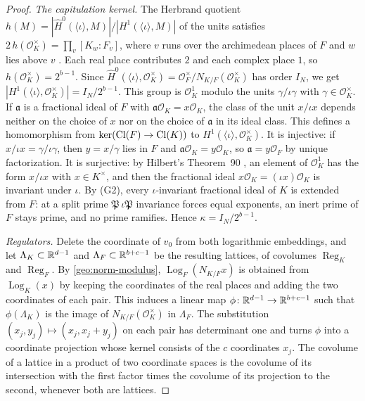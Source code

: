 \begin{proof}
\emph{The capitulation kernel.} The Herbrand quotient
$h(M)=|\widehat H^0(\langle\iota\rangle,M)|/|H^1(\langle\iota\rangle,M)|$
\cite[Chapter~II, \S3]{MilneCFT} of the units satisfies
$2\,h(\mathcal O_K^\times)=\prod_v[K_w:F_v]$, where $v$ runs over the
archimedean places of $F$ and $w$ lies above $v$
\cite[Chapter~VII, Proposition~3.1]{MilneCFT}. Each real place
contributes $2$ and each complex place $1$, so
$h(\mathcal O_K^\times)=2^{b-1}$. Since
$\widehat H^0(\langle\iota\rangle,\mathcal O_K^\times)=\mathcal
O_F^\times/N_{K/F}(\mathcal O_K^\times)$ has order $I_N$, we get
$|H^1(\langle\iota\rangle,\mathcal O_K^\times)|=I_N/2^{b-1}$. This group
is $\mathcal O_K^1$ modulo the units $\gamma/\iota\gamma$ with
$\gamma\in\mathcal O_K^\times$. If $\mathfrak a$ is a fractional ideal
of $F$ with $\mathfrak a\mathcal O_K=x\mathcal O_K$, the class of the
unit $x/\iota x$ depends neither on the choice of $x$ nor on the choice
of $\mathfrak a$ in its ideal class. This defines a homomorphism from
$\ker(\operatorname{Cl}(F)\to\operatorname{Cl}(K))$ to $H^1(\langle\iota\rangle,\mathcal O_K^\times)$.
It is injective: if $x/\iota x=\gamma/\iota\gamma$, then $y=x/\gamma$
lies in $F$ and $\mathfrak a\mathcal O_K=y\mathcal O_K$, so
$\mathfrak a=y\mathcal O_F$ by unique factorization. It is surjective:
by Hilbert's Theorem~90 \cite[Chapter~II, Corollary~1.23]{MilneCFT}, an
element of $\mathcal O_K^1$ has the form $x/\iota x$ with
$x\in K^\times$, and then the fractional ideal
$x\mathcal O_K=(\iota x)\mathcal O_K$ is invariant under $\iota$. By
(G2), every $\iota$-invariant fractional ideal of $K$ is extended from
$F$: at a split prime $\mathfrak P\,\iota\mathfrak P$ invariance forces
equal exponents, an inert prime of $F$ stays prime, and no prime
ramifies. Hence $\kappa=I_N/2^{b-1}$.

\emph{Regulators.} Delete the coordinate of $v_0$ from both logarithmic
embeddings, and let $\Lambda_K\subset\mathbb R^{d-1}$ and
$\Lambda_F\subset\mathbb R^{b+c-1}$ be the resulting lattices, of covolumes
$\operatorname{Reg}_K$ and $\operatorname{Reg}_F$. By
\eqref{geo:norm-modulus}, $\operatorname{Log}_F(N_{K/F}x)$ is obtained
from $\operatorname{Log}_K(x)$ by keeping the coordinates of the real
places and adding the two coordinates of each pair. This induces a
linear map $\phi\colon\mathbb R^{d-1}\to\mathbb R^{b+c-1}$ such that
$\phi(\Lambda_K)$ is the image of $N_{K/F}(\mathcal O_K^\times)$ in
$\Lambda_F$. The substitution $(x_j,y_j)\mapsto(x_j,x_j+y_j)$ on each
pair has determinant one and turns $\phi$ into a coordinate projection
whose kernel consists of the $c$ coordinates $x_j$. The covolume of a
lattice in a product of two coordinate spaces is the covolume of its
intersection with the first factor times the covolume of its projection
to the second, whenever both are lattices.


\end{proof}

